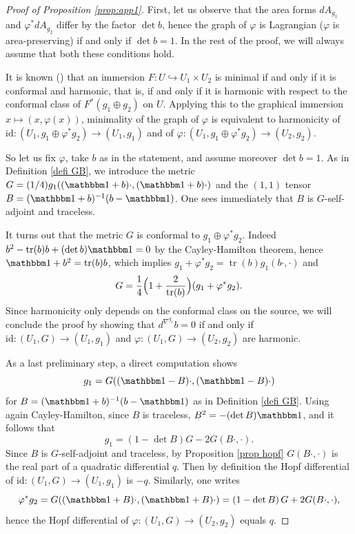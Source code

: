 \documentclass[JEP,XML,SOM,Unicode,NoEqCountersInSection,published]{cedram}
\theoremstyle{definition}
\DeclareMathOperator{\tr}{tr}
\begin{document}
\begin{proof}[Proof of Proposition \ref{prop:app1}]
First, let us observe that the area forms $dA_{g_1}$ and $\varphi^*dA_{g_2}$ differ by the factor $\det b$, hence the graph of $\varphi$ is Lagrangian (\ie $\varphi$ is area-preserving) if and only if $\det b=1$. In the rest of the proof, we will always assume that both these conditions hold.

It is known (\cite[\S 4]{zbMATH03198580}) that an immersion $F:U\hookrightarrow U_1\times U_2$ is minimal if and only if it is conformal and harmonic, that is, if and only if it is harmonic with respect to the conformal class of $F^*(g_1\oplus g_2)$ on $U$. Applying this to the graphical immersion $x\mapsto (x,\varphi(x))$, minimality of the graph of $\varphi$ is equivalent to harmonicity of $\mathrm{id}:(U_1,g_1\oplus \varphi^*g_2)\to (U_1,g_1)$ and of $\varphi:(U_1,g_1\oplus \varphi^*g_2)\to (U_2,g_2)$.

So let us fix $\varphi$, take $b$ as in the statement, and assume moreover $\det b=1$. As in Definition \ref{defi GB}, we introduce the metric $G=(1/4)g_1((\mathbbm 1+b)\cdot,(\mathbbm 1+b)\cdot)$ and the $(1,1)$ tensor $B=(\mathbbm 1+b)^{-1}(b-\mathbbm 1)$. One sees immediately that $B$ is $G$-self-adjoint and traceless.

It turns out that the metric $G$ is conformal to $g_1\oplus\varphi^*g_2$. Indeed $b^2-\tr (b)b+(\det b)\mathbbm 1=0$ by the Cayley-Hamilton theorem, hence $\mathbbm 1+b^2=\tr (b)b$, which implies $g_1+\varphi^*g_2=\tr (b)g_1(b\cdot,\cdot)$ and
\[
G=\frac{1}{4}\Bigl(1+\frac{2}{\tr (b)} \Bigr)(g_1+\varphi^*g_2).
\]
Since harmonicity only depends on the conformal class on the source, we will conclude the proof by showing that $d^{\nabla^{g_1}}\!b=0$ if and only if $\mathrm{id}:(U_1,G)\to (U_1,g_1)$ and $\varphi:(U_1,G)\to (U_2,g_2)$ are harmonic.

As a last preliminary step, a direct computation shows
\begin{equation}\label{eq:g1andG}
g_1=G((\mathbbm 1-B)\cdot,(\mathbbm 1-B)\cdot)
\end{equation}
for $B=(\mathbbm 1+b)^{-1}(b-\mathbbm 1)$ as in Definition \ref{defi GB}. Using again Cayley-Hamilton, since $B$ is traceless, $B^2=-(\det B)\mathbbm 1$, and it follows that
\[
g_1=\left(1-\det B\right)G-2G(B\cdot,\cdot).
\]
Since $B$ is $G$-self-adjoint and traceless, by Proposition \ref{prop hopf} $G(B\cdot,\cdot)$ is the real part of a quadratic differential $q$. Then by definition the Hopf differential of $\mathrm{id}:(U_1,G)\to (U_1,g_1)$ is $-q$. Similarly, one writes
\[
\varphi^*g_2=G((\mathbbm 1+B)\cdot,(\mathbbm 1+B)\cdot)=\left(1-\det B\right)G+2G(B\cdot,\cdot),
\]
hence the Hopf differential of $\varphi:(U_1,G)\to (U_2,g_2)$ equals $q$.


\end{proof}
\end{document}
